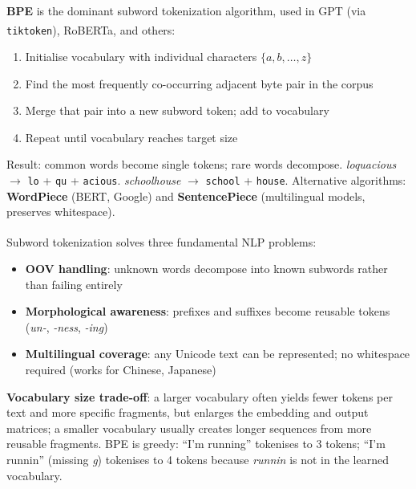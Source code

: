 \begin{tcbitemize}[ skin=sectionraster ]
    \tcbitem[title={Byte Pair Encoding (BPE)}, raster multicolumn=3]
    \textbf{BPE} is the dominant subword tokenization algorithm, used in GPT (via \texttt{tiktoken}), RoBERTa, and others\textsuperscript{\cite[][pp.~20--22]{farrisHowLargeLanguage2025}}:
    \begin{enumerate}
        \item Initialise vocabulary with individual characters $\{a, b, \ldots, z\}$
        \item Find the most frequently co-occurring adjacent byte pair in the corpus
        \item Merge that pair into a new subword token; add to vocabulary
        \item Repeat until vocabulary reaches target size
    \end{enumerate}
    Result: common words become single tokens; rare words decompose.
    \emph{loquacious} $\to$ \texttt{lo} + \texttt{qu} + \texttt{acious}.
    \emph{schoolhouse} $\to$ \texttt{school} + \texttt{house}.
    Alternative algorithms: \textbf{WordPiece} (BERT, Google) and \textbf{SentencePiece} (multilingual models, preserves whitespace).

    \tcbitem[title={Why Subword Tokenization Dominates}, raster multicolumn=3]
    Subword tokenization solves three fundamental NLP problems\textsuperscript{\cite[][pp.~15--16]{farrisHowLargeLanguage2025}}:
    \begin{itemize}
        \item \textbf{OOV handling}: unknown words decompose into known subwords rather than failing entirely
        \item \textbf{Morphological awareness}: prefixes and suffixes become reusable tokens (\emph{un-}, \emph{-ness}, \emph{-ing})
        \item \textbf{Multilingual coverage}: any Unicode text can be represented; no whitespace required (works for Chinese, Japanese)
    \end{itemize}
    \textbf{Vocabulary size trade-off}: a larger vocabulary often yields fewer tokens per text and more specific fragments, but enlarges the embedding and output matrices; a smaller vocabulary usually creates longer sequences from more reusable fragments.
    BPE is greedy: ``I'm running'' tokenises to 3 tokens; ``I'm runnin'' (missing \emph{g}) tokenises to 4 tokens because \emph{runnin} is not in the learned vocabulary.
\end{tcbitemize}

